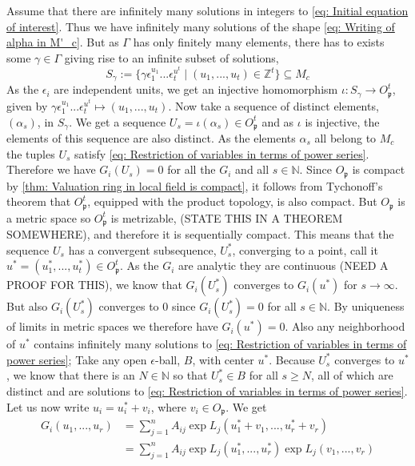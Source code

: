 \documentclass{article}
\newcommand{\mfrak}[1]{\mathfrak{#1}}
\newcommand{\mbb}[1]{\mathbb{#1}}
\begin{document}
Assume that there are infinitely many solutions in integers to \cref{eq: Initial equation of interest}. Thus we have infinitely many solutions of the shape \cref{eq: Writing of alpha in M'_c}. But as $\Gamma$ has only finitely many elements, there has to exists some $\gamma \in \Gamma$ giving rise to an infinite subset of solutions,
$$S_\gamma := \{\gamma \epsilon_1^{u_1} ... \epsilon_t^{u^t} \mid (u_1, ..., u_t) \in \mbb Z^t \} \subseteq M_c$$
As the $\epsilon_i$ are independent units, we get an injective homomorphism $\iota : S_\gamma \to O_\mfrak p^t$, given by $\gamma \epsilon_1^{u_1} ... \epsilon_t^{u^t} \mapsto (u_1, ..., u_t)$. Now take a sequence of distinct elements, $(\alpha_s)$, in $S_\gamma$. We get a sequence $U_s = \iota(\alpha_s) \in O_\mfrak p^t$ and as $\iota$ is injective, the elements of this sequence are also distinct. As the elements $\alpha_s$ all belong to $M_c$ the tuples $U_s$ satisfy \cref{eq: Restriction of variables in terms of power series}. Therefore we have $G_i(U_s) = 0$ for all the $G_i$ and all $s \in \mbb N$. Since $O_\mfrak p$ is compact by \cref{thm: Valuation ring in local field is compact}, it follows from Tychonoff's theorem that $O_\mfrak p^t$, equipped with the product topology, is also compact. But $O_\mfrak p$ is a metric space so $O_\mfrak p^t$ is metrizable, (STATE THIS IN A THEOREM SOMEWHERE), and therefore it is sequentially compact. This means that the sequence $U_s$ has a convergent subsequence, $U^*_s$, converging to a point, call it $u^* = (u_1^*, ..., u_t^*) \in O_{\mfrak p}^t$. As the $G_i$ are analytic they are continuous (NEED A PROOF FOR THIS), we know that $G_i(U^*_s)$ converges to $G_i(u^*)$ for $s \to \infty$. But also $G_i(U^*_s)$ converges to 0 since $G_i(U^*_s) = 0$ for all $s \in \mbb N$. By uniqueness of limits in metric spaces we therefore have $G_i(u^*) = 0$. Also any neighborhood of $u^*$ contains infinitely many solutions to \cref{eq: Restriction of variables in terms of power series}; Take any open $\epsilon$-ball, $B$, with center $u^*$. Because $U^*_s$ converges to $u^*$, we know that there is an $N \in \mbb N$ so that $U^*_s \in B$ for all $s \geq N$, all of which are distinct and are solutions to \cref{eq: Restriction of variables in terms of power series}. Let us now write $u_i = u_i^* + v_i$, where $v_i \in O_\mfrak p$. We get
\begin{align*}
    G_i(u_1, ..., u_r) &= \sum_{j = 1}^n A_{ij} \exp L_j(u_1^* + v_1, ..., u_r^* + v_r) \\ 
    &= \sum_{j = 1}^n A_{ij} \exp L_j(u_1^*, ..., u_r^*) \exp L_j(v_1, ..., v_r)
\end{align*}
\end{document}
